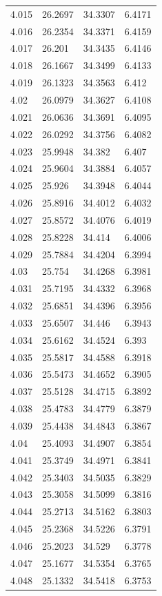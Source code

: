 \begin{tabular}{llll}
4.015 & 26.2697 & 34.3307 & 6.4171 \\
4.016 & 26.2354 & 34.3371 & 6.4159 \\
4.017 & 26.201 & 34.3435 & 6.4146 \\
4.018 & 26.1667 & 34.3499 & 6.4133 \\
4.019 & 26.1323 & 34.3563 & 6.412 \\
4.02 & 26.0979 & 34.3627 & 6.4108 \\
4.021 & 26.0636 & 34.3691 & 6.4095 \\
4.022 & 26.0292 & 34.3756 & 6.4082 \\
4.023 & 25.9948 & 34.382 & 6.407 \\
4.024 & 25.9604 & 34.3884 & 6.4057 \\
4.025 & 25.926 & 34.3948 & 6.4044 \\
4.026 & 25.8916 & 34.4012 & 6.4032 \\
4.027 & 25.8572 & 34.4076 & 6.4019 \\
4.028 & 25.8228 & 34.414 & 6.4006 \\
4.029 & 25.7884 & 34.4204 & 6.3994 \\
4.03 & 25.754 & 34.4268 & 6.3981 \\
4.031 & 25.7195 & 34.4332 & 6.3968 \\
4.032 & 25.6851 & 34.4396 & 6.3956 \\
4.033 & 25.6507 & 34.446 & 6.3943 \\
4.034 & 25.6162 & 34.4524 & 6.393 \\
4.035 & 25.5817 & 34.4588 & 6.3918 \\
4.036 & 25.5473 & 34.4652 & 6.3905 \\
4.037 & 25.5128 & 34.4715 & 6.3892 \\
4.038 & 25.4783 & 34.4779 & 6.3879 \\
4.039 & 25.4438 & 34.4843 & 6.3867 \\
4.04 & 25.4093 & 34.4907 & 6.3854 \\
4.041 & 25.3749 & 34.4971 & 6.3841 \\
4.042 & 25.3403 & 34.5035 & 6.3829 \\
4.043 & 25.3058 & 34.5099 & 6.3816 \\
4.044 & 25.2713 & 34.5162 & 6.3803 \\
4.045 & 25.2368 & 34.5226 & 6.3791 \\
4.046 & 25.2023 & 34.529 & 6.3778 \\
4.047 & 25.1677 & 34.5354 & 6.3765 \\
4.048 & 25.1332 & 34.5418 & 6.3753 \\

\end{tabular}
